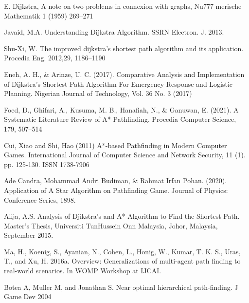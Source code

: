\documentclass[a4paper, 12pt]{article}
\begin{document}
\newpage
%
%


\begin{thebibliography}{21}

 E. Dijkstra, A note on two problems in connexion with graphs, Nu777 merische  Mathematik 1 (1959) 269–271

 Javaid, M.A. Understanding Dijkstra Algorithm. SSRN Electron. J. 2013.

 Shu-Xi, W. The improved dijkstra’s shortest path algorithm and its application. Procedia Eng. 2012,29, 1186–1190

 Eneh, A. H., \& Arinze, U. C. (2017). Comparative Analysis and Implementation of Dijkstra's Shortest Path Algorithm For Emergency Response and Logistic Planning. Nigerian Journal of 
Technology, Vol. 36 No. 3 (2017)

 Foed, D., Ghifari, A., Kusuma, M. B., Hanafiah, N., \& Ganuwan, E. (2021). A Systematic Literature Review of A* Pathfinding. Procedia Computer Science, 179, 507–514

  Cui, Xiao and Shi, Hao (2011) A*-based Pathfinding in Modern Computer Games. International Journal of Computer Science and Network Security, 11 (1). pp. 125-130. ISSN 1738-7906

  Ade Candra, Mohammad Andri Budiman, \& Rahmat Irfan Pohan. (2020). Application of A Star Algorithm on Pathfinding Game. Journal of Physics: Conference Series, 1898.

  Alija, A.S. Analysis of Djikstra’s and A* Algorithm to Find the Shortest Path. Master’s Thesis, Universiti TunHussein Onn Malaysia, Johor, Malaysia, September 2015.

 Ma, H., Koenig, S., Ayanian, N., Cohen, L., Honig, W., Kumar, T. K. S., Uras, T., and Xu, H. 2016a. Overview: Generalizations of multi-agent path finding to real-world scenarios. In WOMP Workshop at IJCAI.

 Botea A, Muller M, and Jonathan S. Near optimal hierarchical path-finding. J Game Dev 2004

\end{thebibliography}
\end{document}
